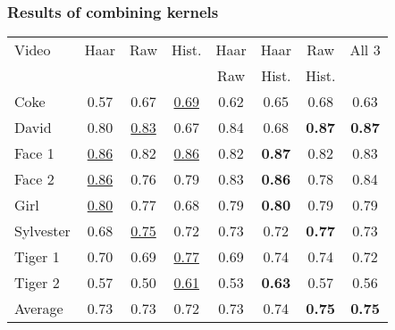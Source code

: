 \begin{frame}
    \frametitle{Results of combining kernels}
    \begin{tabular}{l c c c c c c c}
        \toprule
        Video     & Haar & Raw & Hist. & Haar & Haar  & Raw   & All 3 \\
                  &      &     &       & Raw  & Hist. & Hist. &       \\
        \midrule
        Coke      &            0.57  &            0.67  & \underline{0.69} & 0.62 &         0.65  &         0.68  &         0.63  \\
        David     &            0.80  & \underline{0.83} &            0.67  & 0.84 &         0.68  & \textbf{0.87} & \textbf{0.87} \\
        Face 1    & \underline{0.86} &            0.82  & \underline{0.86} & 0.82 & \textbf{0.87} &         0.82  &         0.83  \\
        Face 2    & \underline{0.86} &            0.76  &            0.79  & 0.83 & \textbf{0.86} &         0.78  &         0.84  \\
        Girl      & \underline{0.80} &            0.77  &            0.68  & 0.79 & \textbf{0.80} &         0.79  &         0.79  \\
        Sylvester &            0.68  & \underline{0.75} &            0.72  & 0.73 &         0.72  & \textbf{0.77} &         0.73  \\
        Tiger 1   &            0.70  &            0.69  & \underline{0.77} & 0.69 &         0.74  &         0.74  &         0.72  \\
        Tiger 2   &            0.57  &            0.50  & \underline{0.61} & 0.53 & \textbf{0.63} &         0.57  &         0.56  \\
        Average   &            0.73  &            0.73  &            0.72  & 0.73 &         0.74  & \textbf{0.75} & \textbf{0.75} \\
        \bottomrule
    \end{tabular}
    
\end{frame}


%

